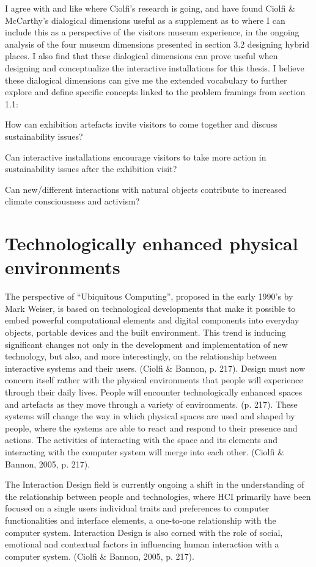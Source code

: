 I agree with and like where Ciolfi’s research is going, and have found Ciolfi & McCarthy’s dialogical dimensions useful as a supplement as to where I can include this as a perspective of the visitors museum experience, in the ongoing analysis of the four museum dimensions presented in section 3.2 designing hybrid places. I also find that these dialogical dimensions can prove useful when designing and conceptualize the interactive installations for this thesis. I believe these dialogical dimensions can give me the extended vocabulary to further explore and define specific concepts linked to the problem framings from section 1.1:

How can exhibition artefacts invite visitors to come together and discuss sustainability issues?\par
Can interactive installations encourage visitors to take more action in sustainability issues after the exhibition visit?\par
Can new/different interactions with natural objects contribute to increased climate consciousness and activism?\par

\section{Technologically enhanced physical environments}
The perspective of “Ubiquitous Computing”, proposed in the early 1990’s by Mark Weiser, is based on technological developments that make it possible to embed powerful computational elements and digital components into everyday objects, portable devices and the built environment. This trend is inducing significant changes not only in the development and implementation of new technology, but also, and more interestingly, on the relationship between interactive systems and their users. (Ciolfi & Bannon, p. 217). Design must now concern itself rather with the physical environments that people will experience through their daily lives. People will encounter technologically enhanced spaces and artefacts as they move through a variety of environments. (p. 217). These systems will change the way in which physical spaces are used and shaped by people, where the systems are able to react and respond to their presence and actions. The activities of interacting with the space and its elements and interacting with the computer system will merge into each other. (Ciolfi & Bannon, 2005, p. 217). 

The Interaction Design field is currently ongoing a shift in the understanding of the relationship between people and technologies, where HCI primarily have been focused on a single users individual traits and preferences to computer functionalities and interface elements, a one-to-one relationship with the computer system. Interaction Design is also corned with the role of social, emotional and contextual factors in influencing human interaction with a computer system. (Ciolfi & Bannon, 2005, p. 217).

